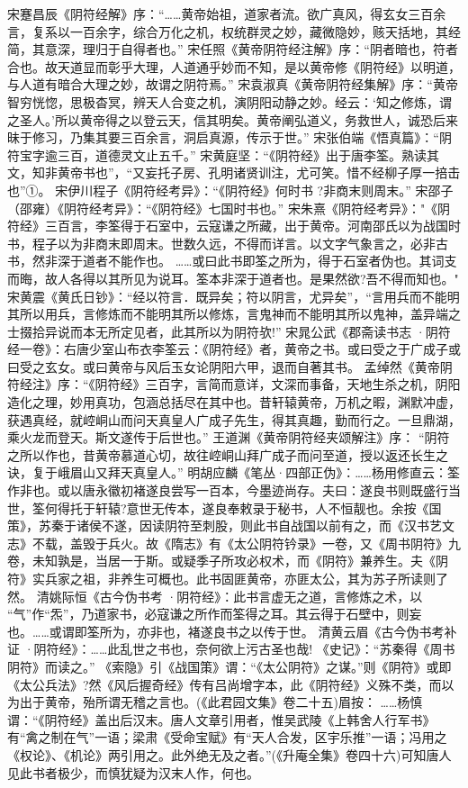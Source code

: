 \documentclass[12pt,UTF8]{ctexbook}
\begin{document}
宋蹇昌辰《阴符经解》序：“……黄帝始祖，道家者流。欲广真风，得玄女三百余言，复系以一百余字，综合万化之机，权统群灵之妙，藏微隐妙，赅天括地，其经简，其意深，理归于自得者也。”
宋任照《黄帝阴符经注解》序：“阴者暗也，符者合也。故天道显而彰乎大理，人道通乎妙而不知，是以黄帝修《阴符经》以明道，与人道有暗合大理之妙，故谓之阴符焉。”
宋袁淑真《黄帝阴符经集解》序：“黄帝智穷恍惚，思极杳冥，辨天人合变之机，演阴阳动静之妙。经云：‘知之修炼，谓之圣人。’所以黄帝得之以登云天，信其明矣。黄帝阐弘道义，务救世人，诚恐后来昧于修习，乃集其要三百余言，洞启真源，传示于世。”
宋张伯端《悟真篇》：“阴符宝字逾三百，道德灵文止五千。”
宋黄庭坚：“《阴符经》出于唐李筌。熟读其文，知非黄帝书也”，“又妄托子房、孔明诸贤训注，尤可笑。惜不经柳子厚一掊击也”①。
宋伊川程子《阴符经考异》：“《阴符经》何时书 ?非商末则周末。”
宋邵子（邵雍）《阴符经考异》：“《阴符经》七国时书也。”
宋朱熹《阴符经考异》："《阴符经》三百言，李筌得于石室中，云寇谦之所藏，出于黄帝。河南邵氏以为战国时书，程子以为非商末即周末。世数久远，不得而详言。以文字气象言之，必非古书，然非深于道者不能作也。 ……或曰此书即筌之所为，得于石室者伪也。其词支而晦，故人各得以其所见为说耳。筌本非深于道者也。是果然欲?吾不得而知也。"
宋黄震《黄氏日钞》：“经以符言．既异矣；符以阴言，尤异矣”，“言用兵而不能明其所以用兵，言修炼而不能明其所以修炼，言鬼神而不能明其所以鬼神，盖异端之士掇拾异说而本无所定见者，此其所以为阴符欤!”
宋晁公武《郡斋读书志 ·阴符经一卷》：右唐少室山布衣李筌云：《阴符经》者，黄帝之书。或曰受之于广成子或曰受之玄女。或曰黄帝与风后玉女论阴阳六甲，退而自著其书。
孟绰然《黄帝阴符经注》序：“《阴符经》三百字，言简而意详，文深而事备，天地生杀之机，阴阳造化之理，妙用真功，包涵总括尽在其中也。昔轩辕黄帝，万机之暇，渊默冲虚，获遇真经，就崆峒山而问天真皇人广成子先生，得其真趣，勤而行之。一旦鼎湖，乘火龙而登天。斯文遂传于后世也。”
王道渊《黄帝阴符经夹颂解注》序： “阴符之所以作也，昔黄帝慕道心切，故往崆峒山拜广成子而问至道，授以返还长生之诀，复于峨眉山又拜天真皇人。”
明胡应麟《笔丛·四部正伪》：……杨用修直云：筌作非也。或以唐永徽初褚遂良尝写一百本，今墨迹尚存。夫曰：遂良书则既盛行当世，筌何得托于轩辕?意世无传本，遂良奉敕录于秘书，人不恒靓也。余按《国策》，苏秦于诸侯不遂，因读阴符至刺股，则此书自战国以前有之，而《汉书艺文志》不载，盖毁于兵火。故《隋志》有《太公阴符钤录》一卷，又《周书阴符》九卷，未知孰是，当居一于斯。或疑季子所攻必权术，而《阴符》兼养生。夫《阴符》实兵家之祖，非养生可概也。此书固匪黄帝，亦匪太公，其为苏子所读则了然。
清姚际恒《古今伪书考 ·阴符经》：此书言虚无之道，言修炼之术，以 “气”作“炁”，乃道家书，必寇谦之所作而筌得之耳。其云得于石壁中，则妄也。……或谓即筌所为，亦非也，褚遂良书之以传于世。
清黄云眉《古今伪书考补证 ·阴符经》：……此乱世之书也，奈何欲上污古圣也哉! 《史记》：“苏秦得《周书阴符》而读之。” 《索隐》引《战国策》谓：“《太公阴符》之谋。”则《阴符》或即《太公兵法》?然《风后握奇经》传有吕尚增字本，此《阴符经》义殊不类，而以为出于黄帝，殆所谓无稽之言也。(《此君园文集》卷二十五)眉按： ……杨慎谓：“《阴符经》盖出后汉末。唐人文章引用者，惟吴武陵《上韩舍人行军书》有“禽之制在气”一语；梁肃《受命宝赋》有“天人合发，区宇乐推”一语；冯用之《权论》、《机论》两引用之。此外绝无及之者。”(《升庵全集》卷四十六)可知唐人见此书者极少，而慎犹疑为汉末人作，何也。
\end{document}
